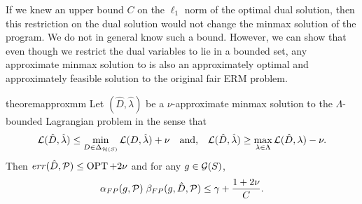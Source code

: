 If we knew an upper bound $C$ on the $\ell_1$ norm of the optimal dual
solution, then this restriction on the dual solution would not change
the minmax solution of the program. We do not in general know such a
bound. However, we can show that even though we restrict the dual
variables to lie in a bounded set, any approximate minmax solution to
 is also an approximately optimal and approximately
feasible solution to the original fair ERM problem.


\begin{restatable}{theorem}{approxmm}\label{thm:approxmm}
  Let $(\hat D, \hat \lambda)$ be a $\nu$-approximate minmax solution
  to the $\Lambda$-bounded Lagrangian problem in the sense that
\[
  \mathcal{L}(\hat D, \hat \lambda) \leq \min_{D\in \Delta_{\mathcal{H}(S)}}\mathcal{L}(D,
  \hat \lambda) + \nu \quad \mbox{and,} \quad \mathcal{L}(\hat D, \hat
  \lambda) \geq \max_{\lambda\in \Lambda} \mathcal{L}(\hat D, \lambda) - \nu.
\]
Then $err(\hat D, \mathcal{P}) \leq \operatorname{OPT} + 2\nu$ and for any $g\in \mathcal{G}(S)$,
\[
  \alpha_{FP}(g, \mathcal{P})\; \beta_{FP}(g, \hat D, \mathcal{P}) \leq \gamma + \frac{1 + 2\nu}{C}.
\]

\end{restatable}













